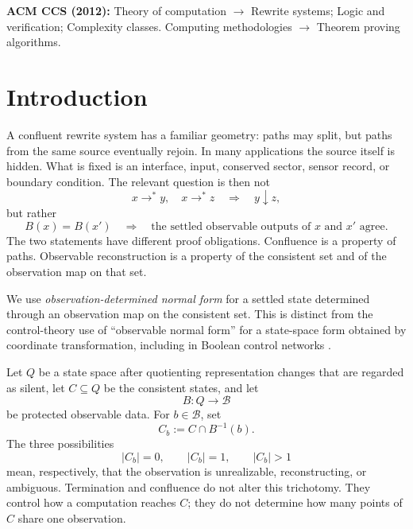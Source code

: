 \documentclass[11pt]{article}
\theoremstyle{definition}
\theoremstyle{remark}
\numberwithin{equation}{section}
\newcommand{\cB}{\mathcal B}
\begin{document}
\noindent\textbf{ACM CCS (2012):} Theory of computation $\rightarrow$ Rewrite systems; Logic and verification; Complexity classes. Computing methodologies $\rightarrow$ Theorem proving algorithms.

\section{Introduction}\label{sec:intro}

A confluent rewrite system has a familiar geometry: paths may split, but paths from the same source eventually rejoin.  In many applications the source itself is hidden.  What is fixed is an interface, input, conserved sector, sensor record, or boundary condition.  The relevant question is then not
\[
 x\to^*y,\quad x\to^*z\quad\Longrightarrow\quad y\downarrow z,
\]
but rather
\[
 B(x)=B(x')\quad\Longrightarrow\quad
 \text{the settled observable outputs of }x\text{ and }x'\text{ agree}.
\]
The two statements have different proof obligations.  Confluence is a property of paths.  Observable reconstruction is a property of the consistent set and of the observation map on that set.

We use \emph{observation-determined normal form} for a settled state determined
through an observation map on the consistent set.  This is distinct from the
control-theory use of \enquote{observable normal form} for a state-space form
obtained by coordinate transformation, including in Boolean control networks
\citep{ChengLiQi2010}.

Let $Q$ be a state space after quotienting representation changes that are regarded as silent, let $C\subseteq Q$ be the consistent states, and let
\[
 B:Q\longrightarrow\cB
\]
be protected observable data.  For $b\in\cB$, set
\[
 C_b:=C\cap B^{-1}(b).
\]
The three possibilities
\[
 |C_b|=0,\qquad |C_b|=1,\qquad |C_b|>1
\]
mean, respectively, that the observation is unrealizable, reconstructing, or ambiguous.  Termination and confluence do not alter this trichotomy.  They control how a computation reaches $C$; they do not determine how many points of $C$ share one observation.
\end{document}
